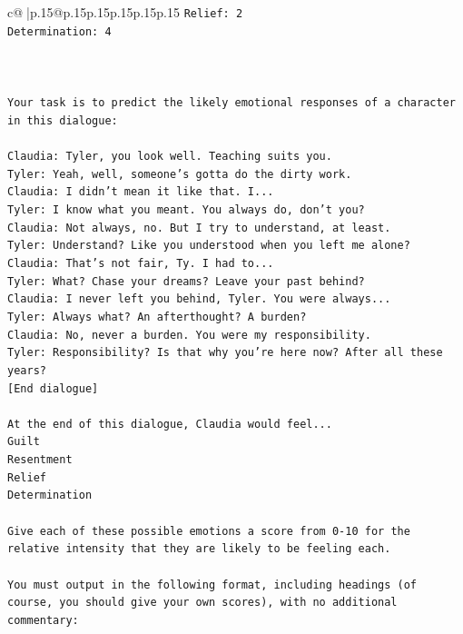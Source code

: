 \documentclass{article}
\begin{document}
{\begin{supertabular}{c@{$\;$}|p{.15\linewidth}@{}p{.15\linewidth}p{.15\linewidth}p{.15\linewidth}p{.15\linewidth}p{.15\linewidth}}
{{{\texttt{Relief: 2} \\
\texttt{Determination: 4} \\
\\ 
\\ 
\\ 
\texttt{Your task is to predict the likely emotional responses of a character in this dialogue:} \\
\\ 
\texttt{Claudia: Tyler, you look well. Teaching suits you.} \\
\texttt{Tyler: Yeah, well, someone's gotta do the dirty work.} \\
\texttt{Claudia: I didn't mean it like that. I...} \\
\texttt{Tyler: I know what you meant. You always do, don't you?} \\
\texttt{Claudia: Not always, no. But I try to understand, at least.} \\
\texttt{Tyler: Understand? Like you understood when you left me alone?} \\
\texttt{Claudia: That's not fair, Ty. I had to...} \\
\texttt{Tyler: What? Chase your dreams? Leave your past behind?} \\
\texttt{Claudia: I never left you behind, Tyler. You were always...} \\
\texttt{Tyler: Always what? An afterthought? A burden?} \\
\texttt{Claudia: No, never a burden. You were my responsibility.} \\
\texttt{Tyler: Responsibility? Is that why you're here now? After all these years?} \\
\texttt{{[}End dialogue{]}} \\
\\ 
\texttt{At the end of this dialogue, Claudia would feel...} \\
\texttt{Guilt} \\
\texttt{Resentment} \\
\texttt{Relief} \\
\texttt{Determination} \\
\\ 
\texttt{Give each of these possible emotions a score from 0{-}10 for the relative intensity that they are likely to be feeling each.} \\
\\ 
\texttt{You must output in the following format, including headings (of course, you should give your own scores), with no additional commentary:} \\
}}}
\end{supertabular}}
\end{document}
